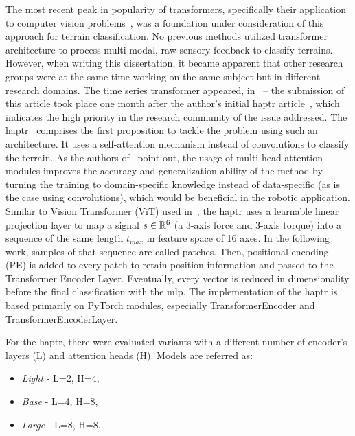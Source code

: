 \documentclass[a4paper, 10pt, twoside]{report}
\begin{document}
The most recent peak in popularity of transformers, specifically their application to computer vision problems~\cite{DETR}, was a foundation under consideration of this approach for terrain classification. No previous methods utilized transformer architecture to process multi-modal, raw sensory feedback to classify terrains. However, when writing this dissertation, it became apparent that other research groups were at the same time working on the same subject but in different research domains. The time series transformer appeared, \eg in~\cite{TST} -- the submission of this article took place one month after the author's initial \acrshort{haptr} article~\cite{ecmr21}, which indicates the high priority in the research community of the issue addressed. The \acrshort{haptr}~\cite{ecmr21} comprises the first proposition to tackle the problem using such an architecture. It uses a self-attention mechanism instead of convolutions to classify the terrain. As the authors of~\cite{park2022how} point out, the usage of multi-head attention modules improves the accuracy and generalization ability of the method by turning the training to domain-specific knowledge instead of data-specific (as is the case using convolutions), which would be beneficial in the robotic application. Similar to Vision Transformer (ViT) used in~\cite{dosovitskiy2020image}, the \acrshort{haptr} uses a learnable linear projection layer to map a signal $s\in\mathbb{R}^{6}$ (\eg a 3-axis force and 3-axis torque) into a sequence of the same length $t_{max}$ in feature space of 16 axes. In the following work, samples of that sequence are called patches. Then, positional encoding (PE) is added to every patch to retain position information and passed to the Transformer Encoder Layer. Eventually, every vector is reduced in dimensionality before the final classification with the \acrshort{mlp}. The implementation of the \acrshort{haptr} is based primarily on PyTorch modules, especially TransformerEncoder and TransformerEncoderLayer.

For the \acrshort{haptr}, there were evaluated variants with a different number of encoder's layers (L) and attention heads (H). Models are referred as: 
\begin{itemize}
    \itemsep0pt
    \item \textit{Light} - L=2, H=4,
    \item \textit{Base} - L=4, H=8,
    \item \textit{Large}  - L=8, H=8.
\end{itemize}
\end{document}
